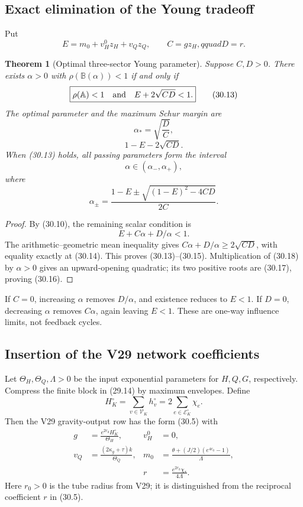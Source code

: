 \documentclass[11pt]{article}
\newtheorem{theorem}{Theorem}[section]
\theoremstyle{remark}
\begin{document}
\subsection{Exact elimination of the Young tradeoff}

Put
\[
 E=m_0+v_H^0z_H+v_Qz_Q,
 \qquad C=gz_H,qquad D=r.                         \tag{30.12}
\]

\begin{theorem}[Optimal three-sector Young parameter]
\label{thm:v17v30-optimal}
Suppose \(C,D>0\).  There exists \(\alpha>0\) with
\(\rho(\mathbb B(\alpha))<1\) if and only if
\[
 \boxed{\rho(\mathbb A)<1
 \quad\hbox{and}\quad E+2\sqrt{CD}<1.}            \tag{30.13}
\]
The optimal parameter and the maximum Schur margin are
\[
 \boxed{\alpha_*=\sqrt{\frac DC}},                \tag{30.14}
\]
\[
 \boxed{1-E-2\sqrt{CD}.}                          \tag{30.15}
\]
When (30.13) holds, all passing parameters form the interval
\[
 \alpha\in(\alpha_-,\alpha_+),                    \tag{30.16}
\]
where
\[
 \alpha_\pm
 =\frac{1-E\pm\sqrt{(1-E)^2-4CD}}{2C}.            \tag{30.17}
\]
\end{theorem}

\begin{proof}
By (30.10), the remaining scalar condition is
\[
 E+C\alpha+D/\alpha<1.                             \tag{30.18}
\]
The arithmetic--geometric mean inequality gives
\(C\alpha+D/\alpha\geq2\sqrt{CD}\), with equality exactly at
(30.14).  This proves (30.13)--(30.15).  Multiplication of (30.18) by
\(\alpha>0\) gives an upward-opening quadratic; its two positive roots
are (30.17), proving (30.16).
\end{proof}

If \(C=0\), increasing \(\alpha\) removes \(D/\alpha\), and existence
reduces to \(E<1\).  If \(D=0\), decreasing \(\alpha\) removes
\(C\alpha\), again leaving \(E<1\).  These are one-way influence
limits, not feedback cycles.

\subsection{Insertion of the V29 network coefficients}

Let \(\Theta_H,\Theta_Q,\Lambda>0\) be the input exponential
parameters for \(H,Q,G\), respectively.  Compress the finite block in
(29.14) by maximum envelopes.  Define
\[
 H_K^\circ=\sum_{v\in\mathcal V_K}h_v^\circ
 =2\sum_{e\in\mathcal E_K^\circ}\chi_e.           \tag{30.19}
\]
Then the V29 gravity-output row has the form (30.5) with
\[
\begin{aligned}
 g&=\frac{e^{2r_0}H_K^\circ}{\Theta_H},
 &v_H^0&=0,\\
 v_Q&=\frac{(2\kappa_g+\tau)k}{\Theta_Q},
 &m_0&=\frac{\theta+(J/2)(e^{4r_0}-1)}{\Lambda},\\
 &&r&=\frac{e^{2r_0}\chi_*}{4\Lambda}.            \tag{30.20}
\end{aligned}
\]
Here \(r_0>0\) is the tube radius from V29; it is distinguished from
the reciprocal coefficient \(r\) in (30.5).
\end{document}
